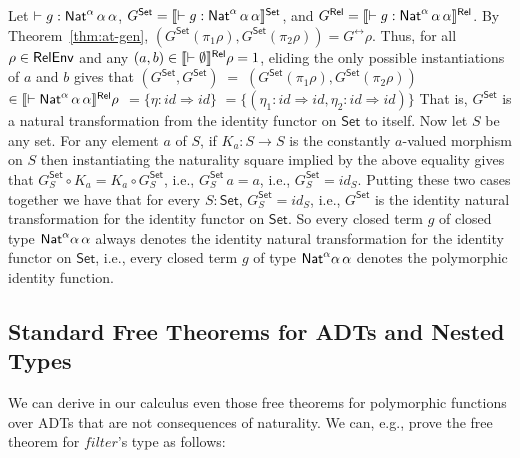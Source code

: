 \documentclass{lmcs}
\theoremstyle{plain}\newtheorem{satz}[thm]{Satz}
\newcommand{\set}{\mathsf{Set}}
\renewcommand{\id}{\mathit{id}}
\begin{document}
{Let $ \vdash g : \mathsf{Nat}^\alpha \,\alpha\,\alpha$, \/$G^\set =
\setsem{\vdash g : \Nat^\alpha \,\alpha\,\alpha}$, and $G^{\mathsf{Rel}} =
\llbracket{\vdash g : \mathsf{Nat}^\alpha \,\alpha\,\alpha}\rrbracket^{\mathsf{Rel}}$.  By
Theorem~\ref{thm:at-gen}, $(G^\set(\pi_1\rho),G^\set(\pi_2\rho)) =
G^\rel\rho$. Thus, for all $\rho \in \mathsf{RelEnv}$ and any $(a, b) \in
\llbracket{\vdash \emptyset}\rrbracket^{\mathsf{Rel}}\rho = 1$, eliding the only possible
instantiations of $a$ and $b$ gives that $(G^\set, G^\set) \; = \;
(G^\set(\pi_1 \rho), G^\set (\pi_2 \rho))$ $ \in \llbracket{\vdash
  \mathsf{Nat}^\alpha \,\alpha\,\alpha}\rrbracket^{\mathsf{Rel}}\rho$ $ = \{\eta : \id \Rightarrow
\id\}$ $ = \{(\eta_1 : \id \Rightarrow \id, \eta_2 : \id \Rightarrow
\id)\}$ That is, $G^\set$ is a natural transformation from the
identity functor on $\set$ to itself. Now let $S$ be any set.  For any
element $a$ of $S$, if $K_a :S \to S$ is the constantly $a$-valued
morphism on $S$ then instantiating the naturality square implied by
the above equality gives that $G^\set_S \circ K_a = K_a \circ
G^\set_S$, i.e., $G^\set_S \, a = a$, i.e., $G^\set_S = \id_S$.
Putting these two cases together we have that for every $S : \set$,
$G^\set_S = \id_S$, i.e., $G^\set$ is the identity natural
transformation for the identity functor on $\set$. So every closed
term $g$ of closed type $\mathsf{Nat}^\alpha\alpha\,\alpha$ always denotes the
identity natural transformation for the identity functor on $\set$,
i.e., every closed term $g$ of type $\mathsf{Nat}^\alpha\alpha\,\alpha$
denotes the polymorphic identity function.

\subsection{Standard Free Theorems for ADTs and Nested
  Types}\label{sec:ft-adt} 

We can derive in our calculus even those free theorems for polymorphic
functions over ADTs that are not consequences of naturality.  We can,
e.g., prove the free theorem for $\mathit{filter}$'s type as follows:

}
\end{document}
